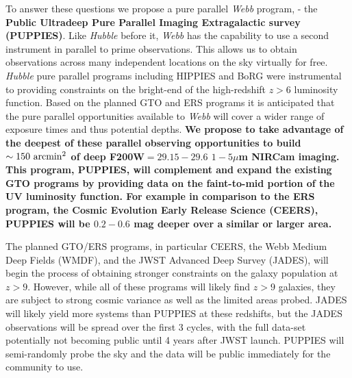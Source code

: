 \documentclass[12pt]{article}
\begin{document}
To answer these questions we propose a pure parallel {\it Webb} program, - the {\bf Public Ultradeep Pure Parallel Imaging Extragalactic survey (PUPPIES)}.   Like \emph{Hubble} before it, \emph{Webb} has the capability to use a second instrument in parallel to prime observations. This allows us to obtain observations across many independent locations on the sky virtually for free. \emph{Hubble} pure parallel programs including HIPPIES \citep{Yan2011}and BoRG \citep{Trenti2011} were instrumental to providing constraints on the bright-end of the high-redshift $z>6$ luminosity function. Based on the planned GTO and ERS programs it is anticipated that the pure parallel opportunities available to \emph{Webb} will cover a wider range of exposure times and thus potential depths. 
\vspace{2mm}
\noindent
\textbf{We propose to take advantage of the deepest of these parallel observing opportunities to build $\sim 150\ {\rm arcmin^2}$ of deep F200W$=29.15-29.6$ $1-5\mu$m NIRCam imaging.  This program, PUPPIES, will complement and expand the existing GTO programs by providing data on the faint-to-mid portion of the UV luminosity function. For example in comparison to the ERS program, the Cosmic Evolution Early Release Science (CEERS), PUPPIES will be $0.2-0.6$ mag deeper over a similar or larger area.}

The planned GTO/ERS programs, in particular CEERS, the Webb Medium Deep Fields (WMDF), and the JWST Advanced Deep Survey (JADES), will begin the process of obtaining stronger constraints on the galaxy population at $z>9$.   However, while all of these programs will likely find $z > 9$ galaxies, they are subject to strong cosmic variance as well as the limited areas probed.  JADES will likely yield more systems than PUPPIES at these redshifts, but the JADES observations will be spread over the first 3 cycles, with the full data-set potentially not becoming public until 4 years after JWST launch.   PUPPIES will semi-randomly probe the sky and the data will be public immediately for the community to use.
\end{document}

